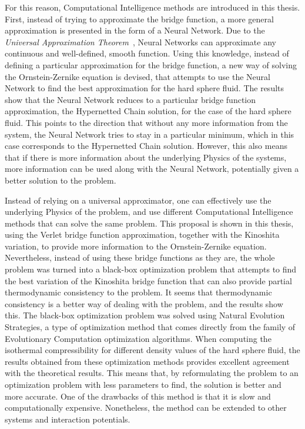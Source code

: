 For this reason, Computational Intelligence methods are introduced in this thesis. First, 
instead of trying to approximate the bridge function, a more general approximation is 
presented in the form of a Neural Network. Due to the 
\emph{Universal Approximation Theorem}~\cite{hornikMultilayerFeedforwardNetworks1989,hornikApproximationCapabilitiesMultilayer1991,cybenkoApproximationSuperpositionsSigmoidal1989}, 
Neural Networks can approximate any continuous and well-defined, smooth function. Using 
this knowledge, instead of defining a particular approximation for the bridge function, a 
new way of solving the Ornstein-Zernike equation is devised, that attempts to use the 
Neural Network to find the best approximation for the hard sphere fluid. The results show 
that the Neural Network reduces to a particular bridge function approximation, the 
Hypernetted Chain solution, for the case of the hard sphere fluid. This points to the 
direction that without any more information from the system, the Neural Network tries to 
stay in a particular minimum, which in this case corresponds to the Hypernetted Chain 
solution. However, this also means that if there is more information about the underlying 
Physics of the systems, more information can be used along with the Neural Network, 
potentially given a better solution to the problem.

Instead of relying on a universal approximator, one can effectively use the underlying 
Physics of the problem, and use different Computational Intelligence methods that can solve 
the same problem. This proposal is shown in this thesis, using the Verlet bridge function 
approximation, together with the Kinoshita variation, to provide more information to the 
Ornstein-Zernike equation. Nevertheless, instead of using these bridge functions as they 
are, the whole problem was turned into a black-box optimization problem that attempts to 
find the best variation of the Kinoshita bridge function that can also provide partial 
thermodynamic consistency to the problem. It seems that thermodynamic consistency is a 
better way of dealing with the problem, and the results show this. The black-box 
optimization problem was solved using Natural Evolution Strategies, a type of optimization 
method that comes directly from the family of Evolutionary Computation optimization 
algorithms. When computing the isothermal compressibility for different density values of 
the hard sphere fluid, the results obtained from these optimization methods provides 
excellent agreement with the theoretical results. This means that, by reformulating the 
problem to an optimization problem with less parameters to find, the solution is better and 
more accurate. One of the drawbacks of this method is that it is slow and computationally 
expensive. Nonetheless, the method can be extended to other systems and interaction 
potentials.

